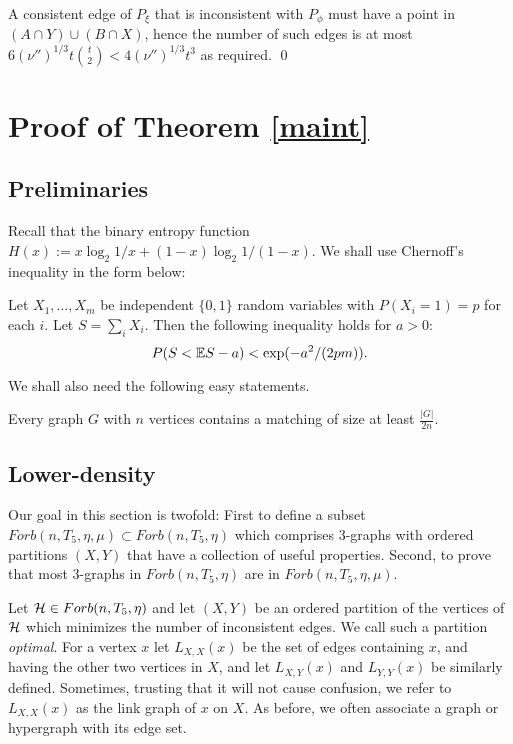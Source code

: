 \documentclass[11pt]{article}
\begin{document}
A consistent edge of $P_{\xi}$ that is inconsistent with $P_{\phi}$
must have a point in $(A \cap Y)\cup  (B \cap X)$, hence the number
of such edges is at most $6(\nu'')^{1/3} t{t \choose
2}<4(\nu'')^{1/3}t^3$ as required.  \qed

\section{Proof of Theorem \ref{maint}}\label{sectproofmain}

\subsection{Preliminaries}\label{subsecpre}



 Recall that  the binary entropy function $H(x):=
x\log_2 1/x+ (1-x)\log_2 1/(1-x).$
We shall use Chernoff's inequality in the form below:

\begin{theorem}\label{chernoff}
Let $X_1,\ldots,X_m$ be independent $\{0,1\}$ random variables with
$P(X_i=1)=p$ for each $i$. Let $S=\sum_i X_i$. Then the following
inequality holds for
$a>0$:\\
$$P(S < {\mathbb E} S - a) < \exp(-a^2/(2pm)).$$
\end{theorem}

We shall also need the following easy statements.

\begin{lemma}\label{matching}
Every graph $G$ with $n$ vertices contains a matching of size at
least $\frac{|G|}{2n}$.
\end{lemma}


\subsection{Lower-density}\label{sublower}


Our goal in this section is twofold: First to define a subset
$Forb(n,T_5,\eta,\mu)\subset Forb(n,T_5,\eta)$ which comprises
3-graphs with ordered partitions $(X,Y)$ that have a collection
of useful properties. Second, to prove that most 3-graphs in
$Forb(n,T_5,\eta)$ are in $Forb(n,T_5,\eta,\mu)$.

 Let $\mathcal{H}\in
Forb(n,T_5,\eta)$ and let $(X,Y)$ be an ordered partition of
the vertices of $\mathcal{H}$ which minimizes the number of inconsistent
edges. We call such a partition {\it optimal}. For a vertex $x$
let $L_{X,X}(x)$ be the set of edges containing $x$,
 and having the other two vertices in $X$, and let
 $ L_{X,Y}(x)$ and $L_{Y,Y}(x)$ be similarly defined. Sometimes, trusting that it will not cause confusion, we refer to
 $L_{X,X}(x)$ as the link graph of $x$ on $X$.  As before, we often associate a graph or hypergraph with its edge set.
\end{document}
